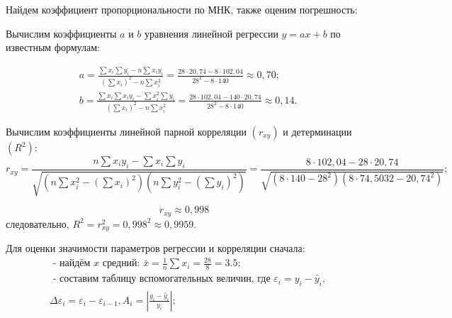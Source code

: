 \documentclass[a4paper, 12pt]{article}%
\begin{document}
Найдем коэффициент пропорциональности по МНК, также оценим погрешность:

Вычислим коэффициенты $a$ и $b$ уравнения линейной регрессии $\hat{y}=a x+b$ по известным формулам:

$$
\begin{aligned}
&a=\frac{\sum x_{i} \sum y_{i}-n \sum x_{i} y_{i}}{\left(\sum x_{i}\right)^{2}-n \sum x_{i}^{2}}=\frac{28 \cdot 20,74-8 \cdot 102,04}{28^{2} - 8 \cdot 140} \approx 0,70 ; \\
&b=\frac{\sum x_{i} \sum x_{i} y_{i}-\sum x_{i}^{2} \sum y_{i}}{\left(\sum x_{i}\right)^{2}-n \sum x_{i}^{2}}=\frac{28 \cdot 102,04-140 \cdot 20,74}{28^{2} - 8 \cdot 140} \approx 0,14 .
\end{aligned}
$$

Вычислим коэффициенты линейной парной корреляции $\left(r_{x y}\right)$ и детерминации $\left(R^{2}\right):$
$$
r_{x y}=\frac{n \sum x_{i} y_{i}-\sum x_{i} \sum y_{i}}{\sqrt{\left(n \sum x_{i}^{2}-\left(\sum x_{i}\right)^{2}\right)\left(n \sum y_{i}^{2}-\left(\sum y_{i}\right)^{2}\right)}}=\frac{8 \cdot 102,04-28 \cdot 20,74}{\sqrt{\left(8 \cdot 140-28^{2}\right)\left(8 \cdot 74,5032-20,74^{2}\right)}};
$$

$$ r_{xy} \approx 0,998 $$
следовательно, $R^{2}=r_{x y}^{2}=0,998^{2} \approx 0,9959 .$

Для оценки значимости параметров регрессии и корреляции сначала:
$$
\begin{aligned}
&\text { - найдём } x \text { средний: } \bar{x}=\frac{1}{n} \sum x_{i}=\frac{28}{8}=3.5 ; \\
&\text { - составим таблицу вспомогательных величин, где } \varepsilon_{i}=y_{i}-\hat{y}_{i}, \\
&\Delta \varepsilon_{i}=\varepsilon_{i}-\varepsilon_{i-1}, A_{i}=\left|\frac{y_{i}-\hat{y}_{i}}{y_{i}}\right|:
\end{aligned}
$$
\end{document}
